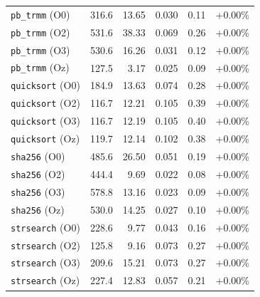 {\begin{longtable}{lrrrrr}
\texttt{pb\_trmm} (O0) & 316.6 & 13.65 & 0.030 & 0.11 & +0.00\% \\
\texttt{pb\_trmm} (O2) & 531.6 & 38.33 & 0.069 & 0.26 & +0.00\% \\
\texttt{pb\_trmm} (O3) & 530.6 & 16.26 & 0.031 & 0.12 & +0.00\% \\
\texttt{pb\_trmm} (Oz) & 127.5 & 3.17 & 0.025 & 0.09 & +0.00\% \\
\texttt{quicksort} (O0) & 184.9 & 13.63 & 0.074 & 0.28 & +0.00\% \\
\texttt{quicksort} (O2) & 116.7 & 12.21 & 0.105 & 0.39 & +0.00\% \\
\texttt{quicksort} (O3) & 116.7 & 12.19 & 0.105 & 0.40 & +0.00\% \\
\texttt{quicksort} (Oz) & 119.7 & 12.14 & 0.102 & 0.38 & +0.00\% \\
\texttt{sha256} (O0) & 485.6 & 26.50 & 0.051 & 0.19 & +0.00\% \\
\texttt{sha256} (O2) & 444.4 & 9.69 & 0.022 & 0.08 & +0.00\% \\
\texttt{sha256} (O3) & 578.8 & 13.16 & 0.023 & 0.09 & +0.00\% \\
\texttt{sha256} (Oz) & 530.0 & 14.25 & 0.027 & 0.10 & +0.00\% \\
\texttt{strsearch} (O0) & 228.6 & 9.77 & 0.043 & 0.16 & +0.00\% \\
\texttt{strsearch} (O2) & 125.8 & 9.16 & 0.073 & 0.27 & +0.00\% \\
\texttt{strsearch} (O3) & 209.6 & 15.21 & 0.073 & 0.27 & +0.00\% \\
\texttt{strsearch} (Oz) & 227.4 & 12.83 & 0.057 & 0.21 & +0.00\% \\
\end{longtable}
}
